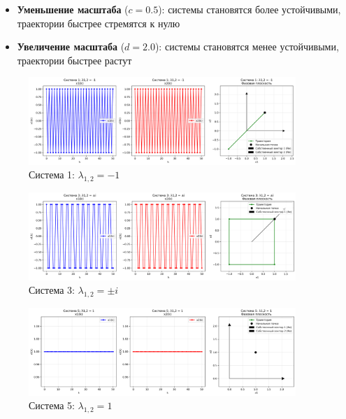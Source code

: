 \begin{itemize}
    \item \textbf{Уменьшение масштаба} ($c = 0.5$): системы становятся более устойчивыми, траектории быстрее стремятся к нулю
    \item \textbf{Увеличение масштаба} ($d = 2.0$): системы становятся менее устойчивыми, траектории быстрее растут
\end{itemize}

\begin{figure}[H]
    \centering
    \includegraphics[width=0.9\textwidth]{images/task2/system1_lambda_minus1.png}
    \caption{Система 1: $\lambda_{1,2} = -1$}
\end{figure}

\begin{figure}[H]
    \centering
    \includegraphics[width=0.9\textwidth]{images/task2/system3_lambda_pure_imaginary.png}
    \caption{Система 3: $\lambda_{1,2} = \pm i$}
\end{figure}

\begin{figure}[H]
    \centering
    \includegraphics[width=0.9\textwidth]{images/task2/system5_lambda_plus1.png}
    \caption{Система 5: $\lambda_{1,2} = 1$}
\end{figure}


